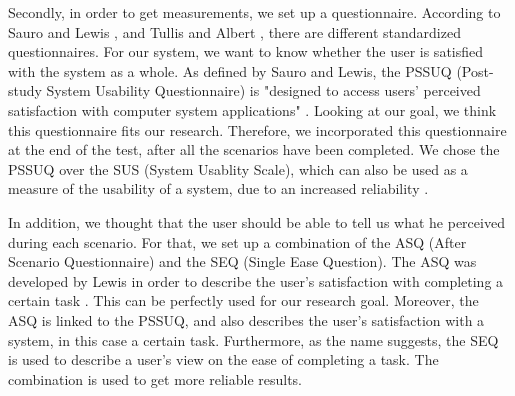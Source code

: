 \documentclass[11pt,a4paper]{article}
\begin{document}
Secondly, in order to get measurements, we set up a questionnaire. According to Sauro and Lewis \cite{sauro2012quantifying}, and Tullis and Albert \cite{albert2013measuring}, there are different standardized questionnaires. For our system, we want to know whether the user is satisfied with the system as a whole. As defined by Sauro and Lewis, the PSSUQ (Post-study System Usability Questionnaire) is "designed to access users' perceived satisfaction with computer system applications" \cite{sauro2012quantifying}. Looking at our goal, we think this questionnaire fits our research. Therefore, we incorporated this questionnaire at the end of the test, after all the scenarios have been completed. We chose the PSSUQ over the SUS (System Usablity Scale), which can also be used as a measure of the usability of a system, due to an increased reliability \cite{sauro2012quantifying}.

In addition, we thought that the user should be able to tell us what he perceived during each scenario. For that, we set up a combination of the ASQ (After Scenario Questionnaire) and the SEQ (Single Ease Question). The ASQ was developed by Lewis in order to describe the user's satisfaction with completing a certain task \cite{sauro2012quantifying}\cite{lewis1995ibm}. This can be perfectly used for our research goal. Moreover, the ASQ is linked to the PSSUQ, and also describes the user's satisfaction with a system, in this case a certain task. Furthermore, as the name suggests, the SEQ is used to describe a user's view on the ease of completing a task. The combination is used to get more reliable results.
\end{document}

